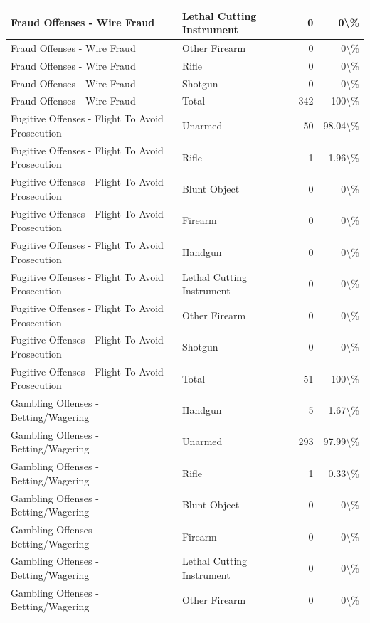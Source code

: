 \documentclass[
]{krantz}
\begin{document}
\begin{longtable}[t]{l|l|r|r}
\hline
Fraud Offenses - Wire Fraud & Lethal Cutting Instrument & 0 & 0\textbackslash{}\%\\
\hline
Fraud Offenses - Wire Fraud & Other Firearm & 0 & 0\textbackslash{}\%\\
\hline
Fraud Offenses - Wire Fraud & Rifle & 0 & 0\textbackslash{}\%\\
\hline
Fraud Offenses - Wire Fraud & Shotgun & 0 & 0\textbackslash{}\%\\
\hline
Fraud Offenses - Wire Fraud & Total & 342 & 100\textbackslash{}\%\\
\hline
Fugitive Offenses - Flight To Avoid Prosecution & Unarmed & 50 & 98.04\textbackslash{}\%\\
\hline
Fugitive Offenses - Flight To Avoid Prosecution & Rifle & 1 & 1.96\textbackslash{}\%\\
\hline
Fugitive Offenses - Flight To Avoid Prosecution & Blunt Object & 0 & 0\textbackslash{}\%\\
\hline
Fugitive Offenses - Flight To Avoid Prosecution & Firearm & 0 & 0\textbackslash{}\%\\
\hline
Fugitive Offenses - Flight To Avoid Prosecution & Handgun & 0 & 0\textbackslash{}\%\\
\hline
Fugitive Offenses - Flight To Avoid Prosecution & Lethal Cutting Instrument & 0 & 0\textbackslash{}\%\\
\hline
Fugitive Offenses - Flight To Avoid Prosecution & Other Firearm & 0 & 0\textbackslash{}\%\\
\hline
Fugitive Offenses - Flight To Avoid Prosecution & Shotgun & 0 & 0\textbackslash{}\%\\
\hline
Fugitive Offenses - Flight To Avoid Prosecution & Total & 51 & 100\textbackslash{}\%\\
\hline
Gambling Offenses - Betting/Wagering & Handgun & 5 & 1.67\textbackslash{}\%\\
\hline
Gambling Offenses - Betting/Wagering & Unarmed & 293 & 97.99\textbackslash{}\%\\
\hline
Gambling Offenses - Betting/Wagering & Rifle & 1 & 0.33\textbackslash{}\%\\
\hline
Gambling Offenses - Betting/Wagering & Blunt Object & 0 & 0\textbackslash{}\%\\
\hline
Gambling Offenses - Betting/Wagering & Firearm & 0 & 0\textbackslash{}\%\\
\hline
Gambling Offenses - Betting/Wagering & Lethal Cutting Instrument & 0 & 0\textbackslash{}\%\\
\hline
Gambling Offenses - Betting/Wagering & Other Firearm & 0 & 0\textbackslash{}\%\\

\end{longtable}
\end{document}
